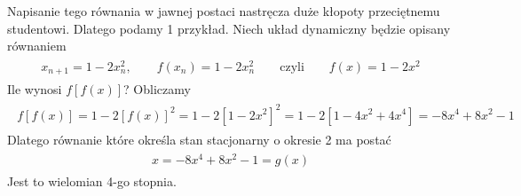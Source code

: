 \documentclass[a4paper,12pt,polish]{sphinxmanual}
\begin{document}
Napisanie tego równania w jawnej postaci nastręcza duże kłopoty przeciętnemu studentowi. Dlatego podamy 1 przykład. Niech układ dynamiczny będzie opisany równaniem
\label{ch1/chI031:equation-eqn30}\begin{gather}
\begin{split}x_{n+1} = 1- 2 x_n^2, \qquad f(x_n) = 1 - 2 x_n^2 \qquad \mbox{czyli} \qquad f(x) = 1 - 2 x^2\end{split}\label{ch1/chI031-eqn30}
\end{gather}
Ile wynosi $f[f(x)]$? Obliczamy
\label{ch1/chI031:equation-eqn31}\begin{gather}
\begin{split}f[f(x)] = 1 - 2 [f(x)]^2  =  1 - 2 [1 - 2 x^2]^2 = 1 - 2[1 - 4 x^2 + 4 x^4] = -8 x^4 + 8 x^2 -1\end{split}\label{ch1/chI031-eqn31}
\end{gather}
Dlatego równanie które określa stan stacjonarny o okresie 2 ma postać
\label{ch1/chI031:equation-eqn32}\begin{gather}
\begin{split}x = -8 x^4 + 8 x^2 -1 = g(x)\end{split}\label{ch1/chI031-eqn32}
\end{gather}
Jest to wielomian 4-go stopnia.
\end{document}
